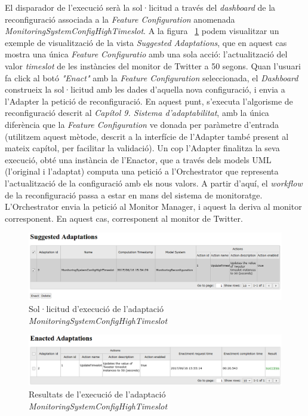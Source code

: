 El disparador de l'execució serà la sol·licitud a través del \textit{dashboard} de la reconfiguració associada a la \textit{Feature Configuration} anomenada \textit{MonitoringSystemConfigHighTimeslot}. A la figura ~\ref{fig:dashboard1} podem visualitzar un exemple de visualització de la vista \textit{Suggested Adaptations}, que en aquest cas mostra una única \textit{Feature Configuratio} amb una sola acció: l'actualització del valor \textit{timeslot} de les instàncies del monitor de Twitter a 50 segons. Quan l'usuari fa click al botó \textit{"Enact"} amb la \textit{Feature Configuration} seleccionada, el \textit{Dashboard} construeix la sol·licitud amb les dades d'aquella nova configuració, i envia a l'Adapter la petició de reconfiguració. En aquest punt, s'executa l'algorisme de reconfiguració descrit al \textit{Capítol 9. Sistema d'adaptabilitat}, amb la única diferència que la \textit{Feature Configuration} ve donada per paràmetre d'entrada (utilitzem aquest mètode, descrit a la interfície de l'Adapter també present al mateix capítol, per facilitar la validació). Un cop l'Adapter finalitza la seva execució, obté una instància de l'Enactor, que a través dels models UML (l'original i l'adaptat) computa una petició a l'Orchestrator que representa l'actualització de la configuració amb els nous valors. A partir d'aquí, el \textit{workflow} de la reconfiguració passa a estar en mans del sistema de monitoratge. L'Orchestrator envia la petició al Monitor Manager, i aquest la deriva al monitor corresponent. En aquest cas, corresponent al monitor de Twitter.\\

\begin{figure}[H]
\centering
\includegraphics[width=14cm]{Figures/dashboard1}
\decoRule
\caption{Sol·licitud d'execució de l'adaptació \textit{MonitoringSystemConfigHighTimeslot}}
\label{fig:dashboard1}
\end{figure} 

\begin{figure}[H]
\centering
\includegraphics[width=14cm]{Figures/dashboard2}
\decoRule
\caption{Resultats de l'execució de l'adaptació \textit{MonitoringSystemConfigHighTimeslot}}
\label{fig:dashboard2}
\end{figure} 

